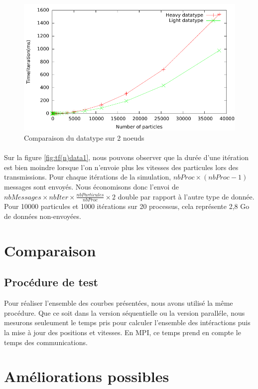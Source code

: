 \documentclass{article}
\begin{document}
\begin{figure}[!h]
  \centering
  \includegraphics[scale=0.5]{ResultTDP2/mpi_datatype/mpi_datatype_multinode.pdf}
  \caption{\label{fig:tf(n)data2}Comparaison du datatype sur 2 noeuds}
\end{figure}


\paragraph{}
Sur la figure \ref{fig:tf(n)data1}, nous pouvons observer que la durée d'une itération est bien moindre lorsque l'on n'envoie plus les vitesses des particules lors des transmissions. Pour chaque itérations de la simulation, $ nbProc \times (nbProc - 1) $ messages sont envoyés. Nous économisons donc l'envoi de $ nbMessages \times nbIter \times \frac{nbParticules}{nbProc} \times 2 $ double par rapport à l'autre type de donnée. Pour 10000 particules et 1000 itérations sur 20 processus, cela représente 2,8 Go de données non-envoyées.


\section{Comparaison}
\subsection{Procédure de test}
Pour réaliser l'ensemble des courbes présentées, nous avons utilisé la même procédure. Que ce soit dans la version séquentielle ou la version paralléle, nous mesurons seuleument le temps pris pour calculer l'ensemble des intéractions puis la mise à jour des positions et vitesses. En MPI, ce temps prend en compte le temps des communications.


\section{Améliorations possibles}
\end{document}

